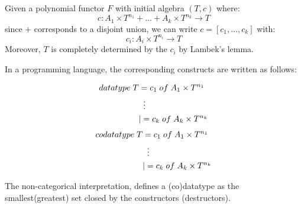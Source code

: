 Given a polynomial functor $F$ with initial algebra $(T,c)$ where: $$c: A_1 \times T^{n_1} + \ldots + A_k \times T^{n_k} \to T$$ since $+$ corresponds to a disjoint union, we can write $c = [c_1,\ldots,c_k]$ with: $$c_i: A_i \times T^{n_i} \to T$$ Moreover, $T$ is completely determined by the $c_i$ by Lambek's lemma. 

In a programming language, the corresponding constructs are written as follows:

\begin{align*}
datatype \; T &= c_1 \; of \; A_1 \times T^{n_1} \\
&\;\;\vdots \notag \\
&| = c_k \; of \; A_k \times T^{n_k} \\
\end{align*}
\begin{align*}
codatatype \; T &= c_1 \; of \; A_1 \times T^{n_1} \\
&\;\;\vdots \notag \\
&| = c_k \; of \; A_k \times T^{n_k} \\
\end{align*}

\begin{remark}
	The non-categorical interpretation, defines a (co)datatype as the smallest(greatest) set closed by the constructors (destructors).
\end{remark}


